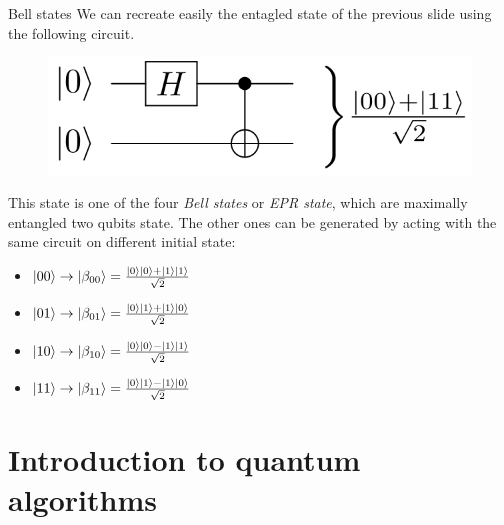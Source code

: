 \documentclass[11p,aspectratio=169]{beamer}
\begin{document}
\begin{frame}{Bell states}
    We can recreate easily the entagled state of the previous slide using the following circuit.
    \begin{figure}
        \includegraphics[width= 0.5 \textwidth]{figures/bell_circuit.png}
    \end{figure}
    This state is one of the four \emph{Bell states} or \emph{EPR state}, which are maximally entangled two qubits state.
    The other ones can be generated by acting with the same circuit on different initial state:

    \begin{multicols*}{2}
        \begin{itemize}
            \item $\ket{00} \rightarrow \ket{\beta_{00}} = \frac{\ket{0}\ket{0} + \ket{1}\ket{1}}{\sqrt{2}}$
            \item $\ket{01} \rightarrow \ket{\beta_{01}} = \frac{\ket{0}\ket{1} + \ket{1}\ket{0}}{\sqrt{2}}$
            \item $\ket{10} \rightarrow \ket{\beta_{10}} = \frac{\ket{0}\ket{0} - \ket{1}\ket{1}}{\sqrt{2}}$
            \item $\ket{11} \rightarrow \ket{\beta_{11}} = \frac{\ket{0}\ket{1} - \ket{1}\ket{0}}{\sqrt{2}}$
        \end{itemize}
        
    \end{multicols*}

\end{frame}
\section{Introduction to quantum algorithms}
\end{document}
